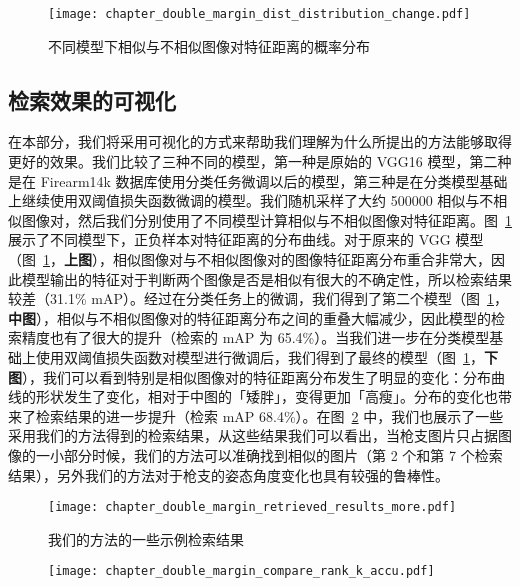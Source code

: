 \begin{figure}[t]
	\centering
	\texttt{[image: chapter\_double\_margin\_dist\_distribution\_change.pdf]}
	\caption{不同模型下相似与不相似图像对特征距离的概率分布}
	\label{fig:feat_dist_distribution_change}
\end{figure}

\subsection{检索效果的可视化}
在本部分，我们将采用可视化的方式来帮助我们理解为什么所提出的方法能够取得更好的效果。我们比较了三种不同的模型，第一种是原始的 VGG16 模型，第二种是在 Firearm14k 数据库使用分类任务微调以后的模型，第三种是在分类模型基础上继续使用双阈值损失函数微调的模型。我们随机采样了大约 500000 相似与不相似图像对，然后我们分别使用了不同模型计算相似与不相似图像对特征距离。图~\ref{fig:feat_dist_distribution_change} 展示了不同模型下，正负样本对特征距离的分布曲线。对于原来的 VGG 模型（图~\ref{fig:feat_dist_distribution_change}，\textbf{上图}），相似图像对与不相似图像对的图像特征距离分布重合非常大，因此模型输出的特征对于判断两个图像是否是相似有很大的不确定性，所以检索结果较差（31.1\% mAP）。经过在分类任务上的微调，我们得到了第二个模型（图~\ref{fig:feat_dist_distribution_change}，\textbf{中图}），相似与不相似图像对的特征距离分布之间的重叠大幅减少，因此模型的检索精度也有了很大的提升（检索的 mAP 为 65.4\%）。当我们进一步在分类模型基础上使用双阈值损失函数对模型进行微调后，我们得到了最终的模型（图~\ref{fig:feat_dist_distribution_change}，\textbf{下图}），我们可以看到特别是相似图像对的特征距离分布发生了明显的变化：分布曲线的形状发生了变化，相对于中图的「矮胖」，变得更加「高瘦」。分布的变化也带来了检索结果的进一步提升（检索 mAP 68.4\%）。在图~\ref{fig:double_margin_retrieval_result} 中，我们也展示了一些采用我们的方法得到的检索结果，从这些结果我们可以看出，当枪支图片只占据图像的一小部分时候，我们的方法可以准确找到相似的图片（第 2 个和第 7 个检索结果），另外我们的方法对于枪支的姿态角度变化也具有较强的鲁棒性。

\begin{figure}[t]
	\centering
	\texttt{[image: chapter\_double\_margin\_retrieved\_results\_more.pdf]}
	\caption{我们的方法的一些示例检索结果}
	\label{fig:double_margin_retrieval_result}
\end{figure}


\begin{figure}[t]
	\centering
	\texttt{[image: chapter\_double\_margin\_compare\_rank\_k\_accu.pdf]}
	\label{fig:rank_k_accuracy_compare}
\end{figure}

